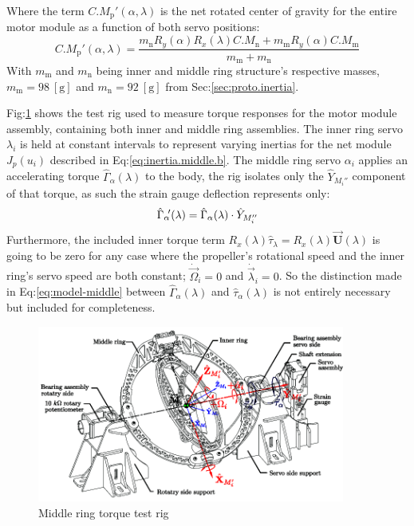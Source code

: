 Where the term $C.M_{\text{p}}'(\alpha,\lambda)$ is the net rotated center of gravity for the entire motor module as a function of both servo positions:
\begin{equation}
C.M_\text{p}'(\alpha,\lambda)=\frac{m_\text{n}R_y(\alpha)R_x(\lambda)C.M_\text{n}+m_\text{m}R_y(\alpha)C.M_\text{m}}{m_\text{m}+m_\text{n}}
\end{equation}
With $m_\text{m}$ and $m_\text{n}$ being inner and middle ring structure's respective masses, $m_\text{m}=98~[\text{g}]$ and $m_\text{n}=92~[\text{g}]$ from Sec:\ref{sec:proto.inertia}.
\par
Fig:\ref{fig:torque-middle} shows the test rig used to measure torque responses for the motor module assembly, containing both inner and middle ring assemblies. The inner ring servo $\lambda_i$ is held at constant intervals to represent varying inertias for the net module $J_p(u_i)$ described in Eq:\ref{eq:inertia.middle.b}. The middle ring servo $\alpha_i$ applies an accelerating torque $\hat{\Gamma}_\alpha(\lambda)$ to the body, the rig isolates only the $\hat{Y}_{M_i''}$ component of that torque, as such the strain gauge deflection represents only:
\begin{equation}
\hat{\Gamma}_\alpha\text{}\hspace{-2pt}'(\lambda)=\hat{\Gamma}_\alpha(\lambda)\cdot\hat{Y}_{M_i''}
\end{equation}
Furthermore, the included inner torque term $R_x(\lambda)\hat{\tau}_\lambda=R_x(\lambda)\vec{\mathbf{U}}(\lambda)$ is going to be zero for any case where the propeller's rotational speed and the inner ring's servo speed are both constant; $\dot{\vec{\Omega}}_i=0$ and $\dot{\vec{\lambda}}_i=0$. So the distinction made in Eq:\ref{eq:model-middle} between $\hat{\Gamma}_\alpha(\lambda)$ and $\hat{\tau}_\alpha(\lambda)$ is not entirely necessary but included for completeness.
\begin{figure}[htbp]
\centering
\includegraphics[width=0.9\textwidth]{figs/torque-middle}
\caption{Middle ring torque test rig}
\label{fig:torque-middle}
\vspace{-6pt}
\end{figure}
